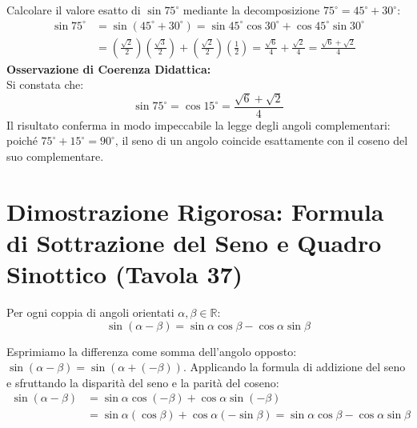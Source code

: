 \documentclass[11pt,a4paper,oneside]{report}
\begin{document}
\begin{esempio}
Calcolare il valore esatto di $\sin 75^\circ$ mediante la decomposizione $75^\circ = 45^\circ + 30^\circ$:
\begin{align}
    \sin 75^\circ &= \sin(45^\circ + 30^\circ) = \sin 45^\circ\cos 30^\circ + \cos 45^\circ\sin 30^\circ \\
    &= \left(\frac{\sqrt{2}}{2}\right)\left(\frac{\sqrt{3}}{2}\right) + \left(\frac{\sqrt{2}}{2}\right)\left(\frac{1}{2}\right) = \frac{\sqrt{6}}{4} + \frac{\sqrt{2}}{4} = \frac{\sqrt{6} + \sqrt{2}}{4}
\end{align}
\textbf{Osservazione di Coerenza Didattica:}\\
Si constata che:
\begin{equation}
    \sin 75^\circ = \cos 15^\circ = \frac{\sqrt{6} + \sqrt{2}}{4}
\end{equation}
Il risultato conferma in modo impeccabile la legge degli angoli complementari: poich\'e $75^\circ + 15^\circ = 90^\circ$, il seno di un angolo coincide esattamente con il coseno del suo complementare.
\end{esempio}

\section{Dimostrazione Rigorosa: Formula di Sottrazione del Seno e Quadro Sinottico (Tavola 37)}

\begin{teorema}
Per ogni coppia di angoli orientati $\alpha, \beta \in \mathbb{R}$:
\begin{equation}
    \sin(\alpha - \beta) = \sin\alpha\cos\beta - \cos\alpha\sin\beta
\end{equation}
\end{teorema}

\begin{dimostrazione}
Esprimiamo la differenza come somma dell'angolo opposto: $\sin(\alpha - \beta) = \sin(\alpha + (-\beta))$.
Applicando la formula di addizione del seno e sfruttando la disparit\`a del seno e la parit\`a del coseno:
\begin{align}
    \sin(\alpha - \beta) &= \sin\alpha\cos(-\beta) + \cos\alpha\sin(-\beta) \\
    &= \sin\alpha(\cos\beta) + \cos\alpha(-\sin\beta) = \sin\alpha\cos\beta - \cos\alpha\sin\beta
\end{align}
\end{dimostrazione}
\end{document}
